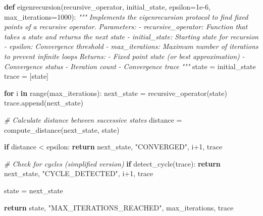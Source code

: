 \documentclass[
]{article}
\newenvironment{Shaded}{}{}
\newcommand{\BuiltInTok}[1]{\textcolor[rgb]{0.00,0.50,0.00}{#1}}
\newcommand{\CommentTok}[1]{\textcolor[rgb]{0.38,0.63,0.69}{\textit{#1}}}
\newcommand{\ControlFlowTok}[1]{\textcolor[rgb]{0.00,0.44,0.13}{\textbf{#1}}}
\newcommand{\DecValTok}[1]{\textcolor[rgb]{0.25,0.63,0.44}{#1}}
\newcommand{\FloatTok}[1]{\textcolor[rgb]{0.25,0.63,0.44}{#1}}
\newcommand{\KeywordTok}[1]{\textcolor[rgb]{0.00,0.44,0.13}{\textbf{#1}}}
\newcommand{\NormalTok}[1]{#1}
\newcommand{\OperatorTok}[1]{\textcolor[rgb]{0.40,0.40,0.40}{#1}}
\newcommand{\StringTok}[1]{\textcolor[rgb]{0.25,0.44,0.63}{#1}}
\begin{document}
\begin{Shaded}
\begin{Highlighting}[]
\KeywordTok{def}\NormalTok{ eigenrecursion(recursive\_operator, initial\_state, epsilon}\OperatorTok{=}\FloatTok{1e{-}6}\NormalTok{, max\_iterations}\OperatorTok{=}\DecValTok{1000}\NormalTok{):}
   \CommentTok{"""}
\CommentTok{   Implements the eigenrecursion protocol to find fixed points of a recursive operator.}
\CommentTok{   }
\CommentTok{   Parameters:}
\CommentTok{   {-} recursive\_operator: Function that takes a state and returns the next state}
\CommentTok{   {-} initial\_state: Starting state for recursion}
\CommentTok{   {-} epsilon: Convergence threshold}
\CommentTok{   {-} max\_iterations: Maximum number of iterations to prevent infinite loops}
\CommentTok{   }
\CommentTok{   Returns:}
\CommentTok{   {-} Fixed point state (or best approximation)}
\CommentTok{   {-} Convergence status}
\CommentTok{   {-} Iteration count}
\CommentTok{   {-} Convergence trace}
\CommentTok{   """}
\NormalTok{   state }\OperatorTok{=}\NormalTok{ initial\_state}
\NormalTok{   trace }\OperatorTok{=}\NormalTok{ [state]}
   
   \ControlFlowTok{for}\NormalTok{ i }\KeywordTok{in} \BuiltInTok{range}\NormalTok{(max\_iterations):}
\NormalTok{       next\_state }\OperatorTok{=}\NormalTok{ recursive\_operator(state)}
\NormalTok{       trace.append(next\_state)}
       
       \CommentTok{\# Calculate distance between successive states}
\NormalTok{       distance }\OperatorTok{=}\NormalTok{ compute\_distance(next\_state, state)}
       
       \ControlFlowTok{if}\NormalTok{ distance }\OperatorTok{\textless{}}\NormalTok{ epsilon:}
           \ControlFlowTok{return}\NormalTok{ next\_state, }\StringTok{"CONVERGED"}\NormalTok{, i}\OperatorTok{+}\DecValTok{1}\NormalTok{, trace}
       
       \CommentTok{\# Check for cycles (simplified version)}
       \ControlFlowTok{if}\NormalTok{ detect\_cycle(trace):}
           \ControlFlowTok{return}\NormalTok{ next\_state, }\StringTok{"CYCLE\_DETECTED"}\NormalTok{, i}\OperatorTok{+}\DecValTok{1}\NormalTok{, trace}
           
\NormalTok{       state }\OperatorTok{=}\NormalTok{ next\_state}
   
   \ControlFlowTok{return}\NormalTok{ state, }\StringTok{"MAX\_ITERATIONS\_REACHED"}\NormalTok{, max\_iterations, trace}
\end{Highlighting}
\end{Shaded}
\end{document}
